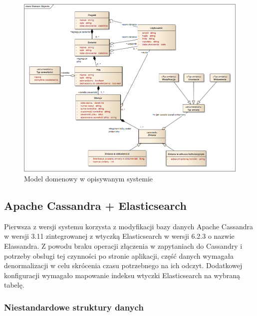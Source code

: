 \begin{figure}[!ht]
\centering
\includegraphics[width=\textwidth]{figures/domain_objects.png}
\caption{Model domenowy w opisywanym systemie}
\label{fig:domainObjects}
\end{figure}

\subsection{Apache Cassandra + Elasticsearch} \label{sec:ModelDanychCassandra}

Pierwsza z wersji systemu korzysta z modyfikacji bazy danych Apache Cassandra w wersji 3.11 zintegrowanej z wtyczką Elasticsearch w wersji 6.2.3 o nazwie Elassandra.
Z powodu braku operacji złączenia w zapytaniach do Cassandry i potrzeby obsługi tej czynności po stronie aplikacji, część danych wymagała denormalizacji w celu skrócenia czasu potrzebnego na ich odczyt.
Dodatkowej konfiguracji wymagało mapowanie indeksu wtyczki Elasticsearch na wybraną tabelę.

\subsubsection{Niestandardowe struktury danych} \label{sec:cassadnraUDFs}

